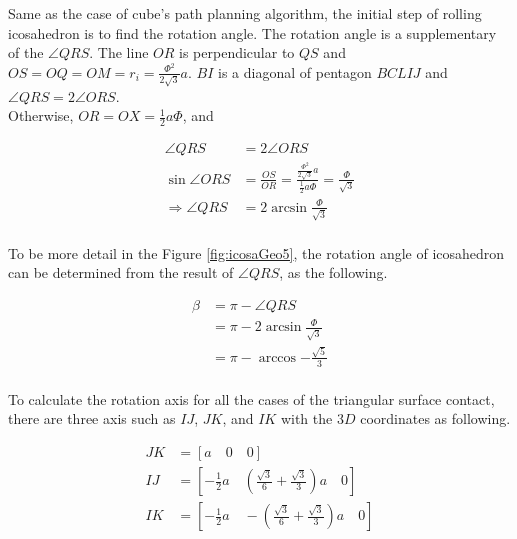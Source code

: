 \noindent Same as the case of cube's path planning algorithm, the initial step of rolling icosahedron is to find the rotation angle. 
The rotation angle is a supplementary of the $\angle{QRS}$. 
The line $OR$ is perpendicular to $QS$ and $OS = OQ = OM = r_i = \frac{\Phi^2}{2\sqrt{3}}a$. 
$BI$ is a diagonal of pentagon $BCLIJ$ and $\angle{QRS}=2\angle{ORS}$.\\

\noindent Otherwise, $OR=OX=\frac{1}{2}a\Phi$, and

\begin{equation*} 
\label{icosa:eq2}
\begin{split}
\angle{QRS} & = 2\angle{ORS}\\
\sin{\angle{ORS}} & = \frac{OS}{OR} = \frac{ \frac{\Phi^2}{2\sqrt{3}}a}{\frac{1}{2}a\Phi} = \frac{\Phi}{\sqrt{3}}\\
\Rightarrow \angle{QRS} & =2\arcsin{\frac{\Phi}{\sqrt{3}}}\\
\end{split}
\end{equation*}

\noindent To be more detail in the Figure \ref{fig:icosaGeo5}, the rotation angle of icosahedron can be determined from the result of $\angle{QRS}$, as the following. 

\begin{equation*} 
\label{icosa:eq3}
\begin{split}
\beta & = \pi- \angle{QRS}\\
      & = \pi - 2\arcsin{\frac{\Phi}{\sqrt{3}}}\\
      & = \pi- \arccos{-\frac{\sqrt{5}}{3}}\\
\end{split}
\end{equation*}

\noindent To calculate the rotation axis for all the cases of the triangular surface contact, there are three axis such as $IJ$, $JK$, and $IK$ with the $3D$ coordinates as following.

\begin{align*}
\label{icosa:eq4}
JK & = [a\quad  0\quad  0]\\
IJ & = [-\frac{1}{2}a\quad  (\frac{\sqrt{3}}{6}+\frac{\sqrt{3}}{3})a\quad  0]\\
IK & = [-\frac{1}{2}a\quad  -(\frac{\sqrt{3}}{6}+\frac{\sqrt{3}}{3})a\quad  0]
\end{align*}

